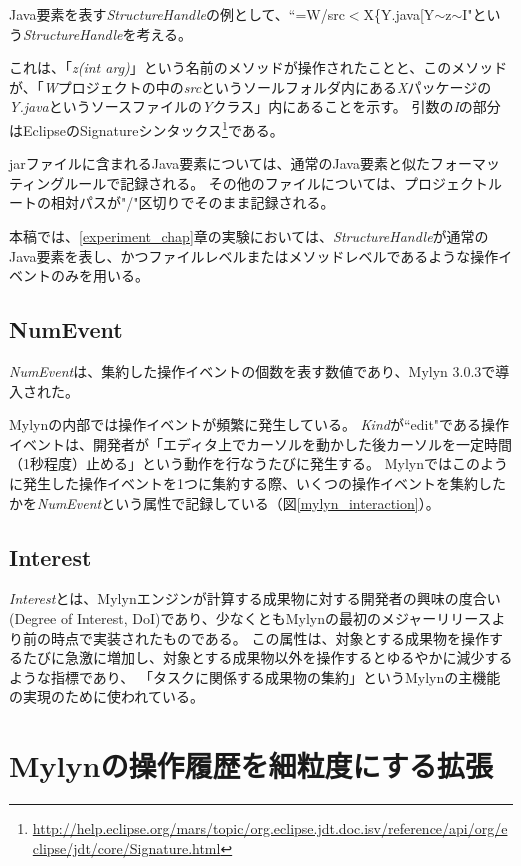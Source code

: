 \documentclass[a4paper]{jsbook}
\begin{document}
Java要素を表す{\it StructureHandle}の例として、``=W/src$<$X\{Y.java[Y$\sim$z$\sim$I"という{\it StructureHandle}を考える。

これは、「{\it z(int arg)}」という名前のメソッドが操作されたことと、このメソッドが、「{\it W}プロジェクトの中の{\it src}というソールフォルダ内にある{\it X}パッケージの{\it Y.java}というソースファイルの{\it Y}クラス」内にあることを示す。
引数の{\it I}の部分はEclipseのSignatureシンタックス\footnote{\url{http://help.eclipse.org/mars/topic/org.eclipse.jdt.doc.isv/reference/api/org/eclipse/jdt/core/Signature.html}}である。

jarファイルに含まれるJava要素については、通常のJava要素と似たフォーマッティングルールで記録される。
その他のファイルについては、プロジェクトルートの相対パスが"/"区切りでそのまま記録される。

本稿では、\ref{experiment_chap}章の実験においては、{\it StructureHandle}が通常のJava要素を表し、かつファイルレベルまたはメソッドレベルであるような操作イベントのみを用いる。

\section{NumEvent}
{\it NumEvent}は、集約した操作イベントの個数を表す数値であり、Mylyn 3.0.3で導入された。

Mylynの内部では操作イベントが頻繁に発生している。
{\it Kind}が``edit"である操作イベントは、開発者が「エディタ上でカーソルを動かした後カーソルを一定時間（1秒程度）止める」という動作を行なうたびに発生する。
Mylynではこのように発生した操作イベントを1つに集約する際、いくつの操作イベントを集約したかを{\it NumEvent}という属性で記録している（図\ref{mylyn_interaction}）。
\section{Interest}
{\it Interest}とは、Mylynエンジンが計算する成果物に対する開発者の興味の度合い(Degree of Interest, DoI)であり\cite{Kersten:2006}、少なくともMylynの最初のメジャーリリースより前の時点で実装されたものである。
この属性は、対象とする成果物を操作するたびに急激に増加し、対象とする成果物以外を操作するとゆるやかに減少するような指標であり、
「タスクに関係する成果物の集約」というMylynの主機能の実現のために使われている。

\chapter{Mylynの操作履歴を細粒度にする拡張}
\end{document}
